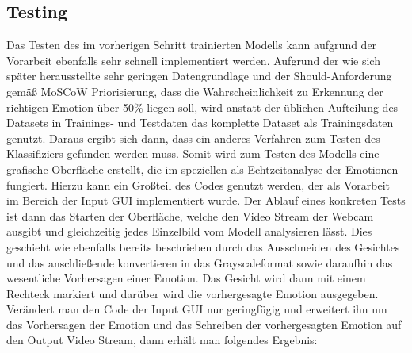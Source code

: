 \documentclass[12pt, a4paper]{report}
\begin{document}
\subsection{Testing}
Das Testen des im vorherigen Schritt trainierten Modells kann aufgrund der Vorarbeit ebenfalls sehr schnell implementiert werden. Aufgrund der wie sich später herausstellte sehr geringen Datengrundlage und der Should-Anforderung gemäß MoSCoW Priorisierung, dass die Wahrscheinlichkeit zu Erkennung der richtigen Emotion über 50\% liegen soll, wird anstatt der üblichen Aufteilung des Datasets in Trainings- und Testdaten das komplette Dataset als Trainingsdaten genutzt. Daraus ergibt sich dann, dass ein anderes Verfahren zum Testen des Klassifiziers gefunden werden muss. Somit wird zum Testen des Modells eine grafische Oberfläche erstellt, die im speziellen als Echtzeitanalyse der Emotionen fungiert. Hierzu kann ein Großteil des Codes genutzt werden, der als Vorarbeit im Bereich der Input GUI implementiert wurde. Der Ablauf eines konkreten Tests ist dann das Starten der Oberfläche, welche den Video Stream der Webcam ausgibt und gleichzeitig jedes Einzelbild vom Modell analysieren lässt. Dies geschieht wie ebenfalls bereits beschrieben durch das Ausschneiden des Gesichtes und das anschließende konvertieren in das Grayscaleformat sowie daraufhin das wesentliche Vorhersagen einer Emotion. Das Gesicht wird dann mit einem Rechteck markiert und darüber wird die vorhergesagte Emotion ausgegeben. Verändert man den Code der Input GUI nur geringfügig und erweitert ihn um das Vorhersagen der Emotion und das Schreiben der vorhergesagten Emotion auf den Output Video Stream, dann erhält man folgendes Ergebnis:

\end{document}
